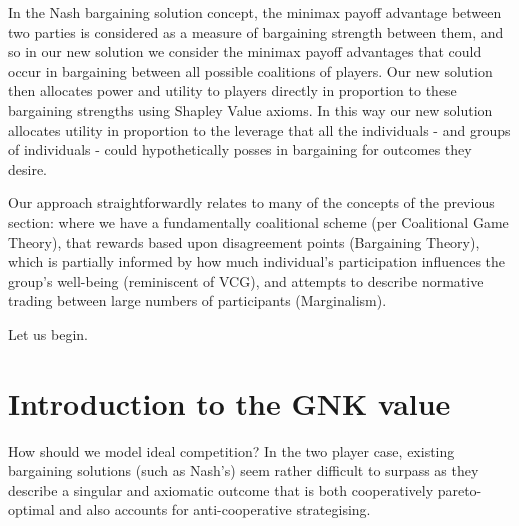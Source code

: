 In the Nash bargaining solution concept, the minimax payoff advantage between two parties is considered as a measure of bargaining strength between them, and so in our new solution we consider the minimax payoff advantages that could occur in bargaining between all possible coalitions of players.
Our new solution then allocates power and utility to players directly in proportion to these bargaining strengths using Shapley Value axioms.
In this way our new solution allocates utility in proportion to the leverage that all the individuals - and groups of individuals - could hypothetically posses in bargaining for outcomes they desire.

Our approach straightforwardly relates to many of the concepts of the previous section: where we have a fundamentally coalitional scheme (per Coalitional Game Theory), that rewards based upon disagreement points (Bargaining Theory), which is partially informed by how much individual's participation influences the group's well-being (reminiscent of VCG), and attempts to describe normative trading between large numbers of participants (Marginalism).



Let us begin.

\section{Introduction to the GNK value}

How should we model ideal competition? In the two player case, existing bargaining solutions (such as Nash's) seem rather difficult to surpass as they describe a singular and axiomatic outcome that is both cooperatively pareto-optimal and also accounts for anti-cooperative strategising.

